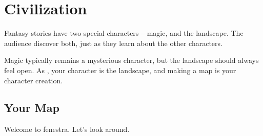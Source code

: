 \chapter{Civilization}

Fantasy stories have two special characters -- magic, and the landscape.
The audience discover both, just as they learn about the other characters.

Magic typically remains a mysterious character, but the landscape should always feel open.
As , your character is the landscape, and making a map is your character creation.

\section{Your Map}
\label{yourMap}

Welcome to \gls{fenestra}.
Let's look around.

